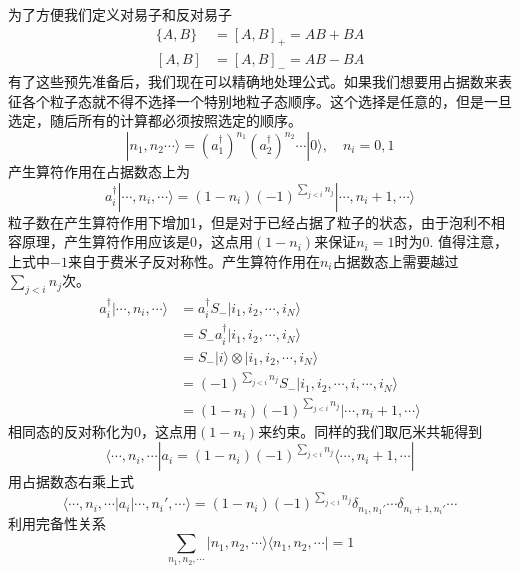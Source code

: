 \documentclass[12pt]{article}
\begin{document}
为了方便我们定义对易子和反对易子
\begin{equation*}
    \begin{split}
        \{A,B\}&=[A,B]_{+}=AB+BA\\
        [A,B]&=[A,B]_-=AB-BA
    \end{split}
\end{equation*}
有了这些预先准备后，我们现在可以精确地处理公式。如果我们想要用占据数来表征各个粒子态就不得不选择一个特别地粒子态顺序。这个选择是任意的，但是一旦选定，随后所有的计算都必须按照选定的顺序。
\begin{equation*}
    |n_1,n_2\cdots\rangle=(a_1^\dagger)^{n_1}(a_2^\dagger)^{n_2}\cdots|0\rangle,\quad n_i=0,1
\end{equation*}
产生算符作用在占据数态上为
\begin{equation*}
    a_i^\dagger|\cdots,n_i,\cdots\rangle=(1-n_i)(-1)^{\sum_{j<i}n_j}|\cdots,n_i+1,\cdots\rangle
\end{equation*}
粒子数在产生算符作用下增加1，但是对于已经占据了粒子的状态，由于泡利不相容原理，产生算符作用应该是$0$，这点用$(1-n_i)$来保证$n_i=1$时为$0$. 值得注意，上式中$-1$来自于费米子反对称性。产生算符作用在$n_i$占据数态上需要越过$\sum_{j<i}n_j$次。
\begin{equation*}
    \begin{split}
        a_i^\dagger|\cdots,n_i,\cdots\rangle&=a_i^\dagger S_-|i_1,i_2,\cdots,i_N\rangle\\
        &=S_-a_i^\dagger|i_1,i_2,\cdots,i_N\rangle\\
        &=S_-|i\rangle\otimes|i_1,i_2,\cdots,i_N\rangle\\
        &=(-1)^{\sum_{j<i}n_j}S_-|i_1,i_2,\cdots,i,\cdots,i_N\rangle\\
        &=(1-n_i)(-1)^{\sum_{j<i}n_j}|\cdots,n_i+1,\cdots\rangle
    \end{split}
\end{equation*}
相同态的反对称化为$0$，这点用$(1-n_i)$来约束。同样的我们取厄米共轭得到
\begin{equation*}
    \langle\cdots,n_i,\cdots|a_i=(1-n_i)(-1)^{\sum_{j<i}n_j}\langle\cdots,n_i+1,\cdots|
\end{equation*}
用占据数态右乘上式
\begin{equation*}
    \langle\cdots,n_i,\cdots|a_i|\cdots,n_i',\cdots\rangle=(1-n_i)(-1)^{\sum_{j<i}n_j}\delta_{n_1,n_1'}\cdots\delta_{n_i+1,n_i'}\cdots
\end{equation*}
利用完备性关系
\begin{equation*}
    \sum_{n_1,n_2,\cdots}|n_1,n_2,\cdots\rangle\langle n_1,n_2,\cdots|=1
\end{equation*}
\end{document}
